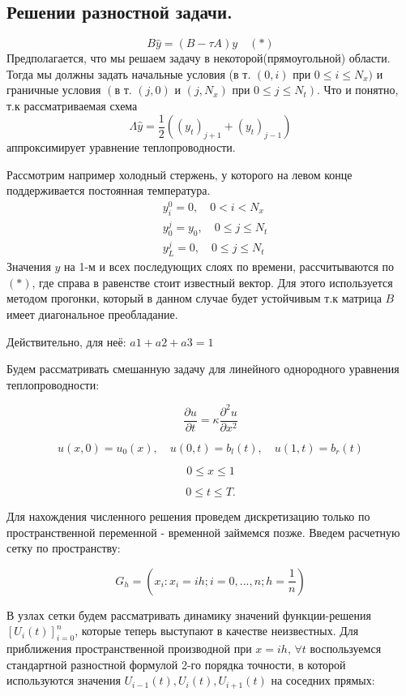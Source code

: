 \documentclass[12pt,a4paper]{article}
\renewcommand{\leq}{\leqslant}
\begin{document}
\subsection{Решении разностной задачи.}
$$B\hat{y} = (B - \tau A)y \quad (*)$$
Предполагается, что мы решаем задачу в некоторой(прямоугольной) области. Тогда мы должны задать начальные условия ($\text{в т. }(0, i)\text{ при } 0\leq i \leq N_x)$ и граничные условия $(\text{в т. }(j, 0)\text{ и }(j, N_x)\text{ при }0\leq j\leq N_t)$. Что и понятно, т.к рассматриваемая схема $$\Lambda\hat{y} = \frac{1}{2}((y_{t})_{j+1} + (y_{t})_{j-1})$$ аппроксимирует уравнение теплопроводности.

Рассмотрим например холодный стержень, у которого на левом конце поддерживается постоянная температура.
\begin{align*}
&y_i^0 = 0, \quad 0 < i < N_x\\
&y_0^j = y_0,\quad 0 \leq j \leq N_t\\
&y_L^j = 0, \quad 0 \leq j \leq N_t
\end{align*}
Значения $y$ на 1-м и всех последующих слоях по времени, рассчитываются по $(*)$, где справа в равенстве стоит известный вектор.
Для этого используется методом прогонки, который в данном случае будет устойчивым т.к матрица $B$ имеет диагональное преобладание.

Действительно, для неё: $a1 + a2 + a3 = 1$

Будем рассматривать смешанную задачу для линейного однородного уравнения теплопроводности:

$$
    \frac{\partial u}{\partial t} = \kappa \frac{\partial^2 u}{\partial x^2}
$$

$$
    u(x, 0) = u_0(x), \quad u(0, t) = b_l(t), \quad u(1, t) = b_r(t)
$$


$$
    0 \leq x \leq 1
$$

$$
    0 \leq t \leq T.
$$


Для нахождения численного решения проведем дискретизацию только по пространственной переменной - временной займемся позже. Введем расчетную сетку по пространству:

$$ 
    G_h = \left( x_i : x_i = i h; i = 0,...,n; h = \frac{1}{n} \right) 
$$

В узлах сетки будем рассматривать динамику значений функции-решения $ \left[ U_i(t) \right]_{i=0}^{n}$, которые теперь выступают в качестве неизвестных. Для приближения пространственной производной при $x = i h, \, \forall t$ воспользуемся стандартной разностной формулой 2-го порядка точности, в которой используются значения $U_{i-1}(t), U_i(t), U_{i+1}(t)$ на соседних прямых:
\end{document}
